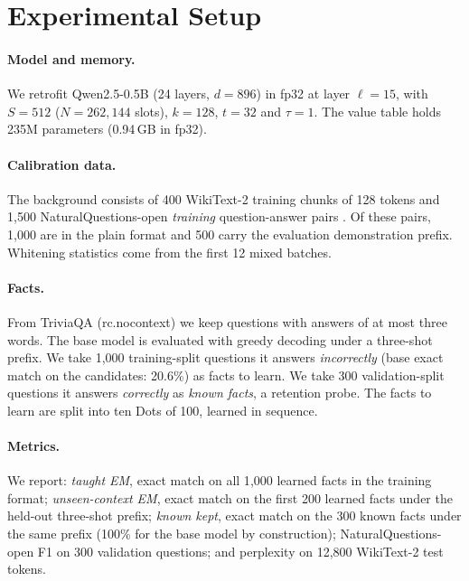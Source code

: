 \documentclass[11pt]{article}
\begin{document}
\section{Experimental Setup}
\label{sec:setup}

\paragraph{Model and memory.} We retrofit Qwen2.5-0.5B \citep{qwen2025} (24 layers, $d=896$) in fp32 at layer $\ell=15$, with $S=512$ ($N=262{,}144$ slots), $k=128$, $t=32$ and $\tau=1$. The value table holds 235M parameters (0.94\,GB in fp32).

\paragraph{Calibration data.} The background consists of 400 WikiText-2 training chunks of 128 tokens \citep{merity2017wikitext} and 1{,}500 NaturalQuestions-open \emph{training} question-answer pairs \citep{kwiatkowski2019nq,lee2019orqa}. Of these pairs, 1{,}000 are in the plain format and 500 carry the evaluation demonstration prefix. Whitening statistics come from the first 12 mixed batches.

\paragraph{Facts.} From TriviaQA \citep{joshi2017triviaqa} (rc.nocontext) we keep questions with answers of at most three words. The base model is evaluated with greedy decoding under a three-shot prefix. We take 1{,}000 training-split questions it answers \emph{incorrectly} (base exact match on the candidates: 20.6\%) as facts to learn. We take 300 validation-split questions it answers \emph{correctly} as \emph{known facts}, a retention probe. The facts to learn are split into ten Dots of 100, learned in sequence.

\paragraph{Metrics.} We report: \emph{taught EM}, exact match on all 1{,}000 learned facts in the training format; \emph{unseen-context EM}, exact match on the first 200 learned facts under the held-out three-shot prefix; \emph{known kept}, exact match on the 300 known facts under the same prefix (100\% for the base model by construction); NaturalQuestions-open F1 on 300 validation questions; and perplexity on 12{,}800 WikiText-2 test tokens.
\end{document}

